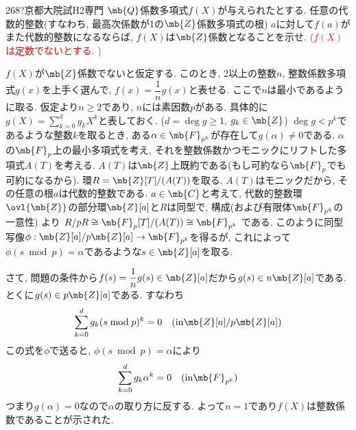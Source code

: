 \begin{thm}{268}{\hosi ?}{京都大院試H2専門}
$\mb{Q}$係数多項式$f(X)$が与えられたとする. 任意の代数的整数(すなわち, 最高次係数が1の$\mb{Z}$係数多項式の根) $a$に対して$f(a)$がまた代数的整数になるならば, $f(X)$は$\mb{Z}$係数となることを示せ. \textcolor{red}{($f(X)$は定数でないとする. )}
\end{thm}
$f(X)$が$\mb{Z}$係数でないと仮定する. このとき, 2以上の整数$n$, 整数係数多項式$g(x)$を上手く選んで, $f(x) = \dfrac{1}{n} g(x)$と表せる. ここで$n$は最小であるように取る. 仮定より$n\geq 2$であり, $n$には素因数$p$がある. 具体的に$g(X) = \sum_{k=0}^{d} g_k X^{k}$と表しておく. ($d = \deg{g} \geq 1$, $g_k \in \mb{Z}$)
 $\deg{g} < p^{k}$であるような整数$k$を取るとき, ある$\alpha\in \mb{F}_{p^{k}}$が存在して$g(\alpha)\neq 0$である. $\alpha$の$\mb{F}_{p}$上の最小多項式を考え, それを整数係数かつモニックにリフトした多項式$A(T)$を考える. $A(T)$は$\mb{Z}$上既約である(もし可約なら$\mb{F}_{p}$でも可約になるから). 環$R=\mb{Z}[T]/(A(T))$を取る. $A(T)$はモニックだから, その任意の根$a$は代数的整数である.  $a\in \mb{C}$と考えて, 代数的整数環$\ovl{\mb{Z}}$の部分環$\mb{Z}[a]$と$R$は同型で,  構成(および有限体$\mb{F}_{p^{k}}$の一意性) より $R/pR \cong \mb{F}_{p}[T]/(A(T)) \cong \mb{F}_{p^{k}}$ である. このように同型写像$\phi:\mb{Z}[a]/p\mb{Z}[a] \to \mb{F}_{p^{k}}$を得るが, これによって$\phi(s\bmod{p}) = \alpha$であるような$s\in \mb{Z}[a]$を取る.   \par 
さて, 問題の条件から$f(s) = \dfrac{1}{n} g(s) \in \mb{Z}[a]$だから$g(s)\in n\mb{Z}[a]$である. とくに$g(s) \in p\mb{Z}[a]$である. すなわち
\[
\sum_{k=0}^{d} g_k (s\bmod{p})^{k} = 0 \quad (\text{in}  \mb{Z}[a]/p\mb{Z}[a])
\]
この式を$\phi$で送ると, $\phi(s\bmod{p}) = \alpha$により
\[
\sum_{k=0}^{d} g_k \alpha^{k} = 0 \quad (\text{in} \mb{F}_{p^{k}})
\]
つまり$g(\alpha) = 0$なので$\alpha$の取り方に反する. よって$n=1$であり$f(X)$は整数係数であることが示された.  
